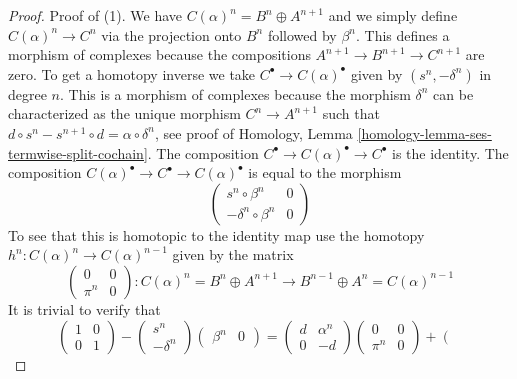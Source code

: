 \begin{proof}

Proof of (1). We have $C(\alpha)^n = B^n \oplus A^{n + 1}$
and we simply define $C(\alpha)^n \to C^n$ via the projection
onto $B^n$ followed by $\beta^n$. This defines
a morphism of complexes because the compositions
$A^{n + 1} \to B^{n + 1} \to C^{n + 1}$ are zero.
To get a homotopy inverse we take
$C^\bullet \to C(\alpha)^\bullet$ given by
$(s^n , -\delta^n)$ in degree $n$. This is a morphism of complexes
because the morphism $\delta^n$ can be characterized as the
unique morphism $C^n \to A^{n + 1}$ such that
$d \circ s^n - s^{n + 1} \circ d = \alpha \circ \delta^n$,
see proof of
Homology, Lemma \ref{homology-lemma-ses-termwise-split-cochain}.
The composition
$C^\bullet \to C(\alpha)^\bullet \to C^\bullet$ is the identity.
The composition $C(\alpha)^\bullet \to C^\bullet \to C(\alpha)^\bullet$
is equal to the morphism
$$
\left(
\begin{matrix}
s^n \circ \beta^n & 0 \\
-\delta^n \circ \beta^n & 0
\end{matrix}
\right)
$$
To see that this is homotopic to the identity map
use the homotopy $h^n : C(\alpha)^n \to C(\alpha)^{n - 1}$
given by the matrix
$$
\left(
\begin{matrix}
0 & 0 \\
\pi^n & 0
\end{matrix}
\right) : C(\alpha)^n = B^n \oplus A^{n + 1} \to
B^{n - 1} \oplus A^n = C(\alpha)^{n - 1}
$$
It is trivial to verify that
$$
\left(
\begin{matrix}
1 & 0 \\
0 & 1
\end{matrix}
\right)
-
\left(
\begin{matrix}
s^n \\
-\delta^n
\end{matrix}
\right)
\left(
\begin{matrix}
\beta^n & 0
\end{matrix}
\right)
=
\left(
\begin{matrix}
d & \alpha^n \\
0 & -d
\end{matrix}
\right)
\left(
\begin{matrix}
0 & 0 \\
\pi^n & 0
\end{matrix}
\right)
+
\left(
\begin{matrix}

\end{matrix}$$
\end{proof}
